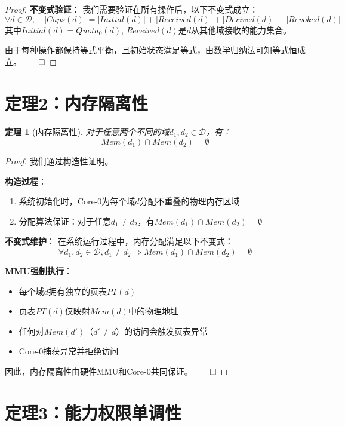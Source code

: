 \documentclass{article}
\newtheorem{theorem}{定理}[section]
\theoremstyle{definition}
\theoremstyle{remark}
\begin{document}
\begin{proof}
    \textbf{不变式验证}：
    我们需要验证在所有操作后，以下不变式成立：
    \[
    \forall d \in \mathcal{D}, \quad |Caps(d)| = |Initial(d)| + |Received(d)| + |Derived(d)| - |Revoked(d)|
    \]
    其中$Initial(d) = Quota_0(d)$, $Received(d)$是$d$从其他域接收的能力集合。

    由于每种操作都保持等式平衡，且初始状态满足等式，由数学归纳法可知等式恒成立。$\qed$
\end{proof}

\section{定理2：内存隔离性}

\begin{theorem}[内存隔离性]
    对于任意两个不同的域$d_1, d_2 \in \mathcal{D}$，有：
    \[
    Mem(d_1) \cap Mem(d_2) = \emptyset
    \]
\end{theorem}

\begin{proof}
    我们通过构造性证明。

    \textbf{构造过程}：
    \begin{enumerate}
        \item 系统初始化时，Core-0为每个域$d$分配不重叠的物理内存区域
        \item 分配算法保证：对于任意$d_1 \neq d_2$，有$Mem(d_1) \cap Mem(d_2) = \emptyset$
    \end{enumerate}

    \textbf{不变式维护}：
    在系统运行过程中，内存分配满足以下不变式：
    \[
    \forall d_1, d_2 \in \mathcal{D}, d_1 \neq d_2 \Rightarrow Mem(d_1) \cap Mem(d_2) = \emptyset
    \]

    \textbf{MMU强制执行}：
    \begin{itemize}
        \item 每个域$d$拥有独立的页表$PT(d)$
        \item 页表$PT(d)$仅映射$Mem(d)$中的物理地址
        \item 任何对$Mem(d')$（$d' \neq d$）的访问会触发页表异常
        \item Core-0捕获异常并拒绝访问
    \end{itemize}

    因此，内存隔离性由硬件MMU和Core-0共同保证。$\qed$
\end{proof}

\section{定理3：能力权限单调性}
\end{document}
